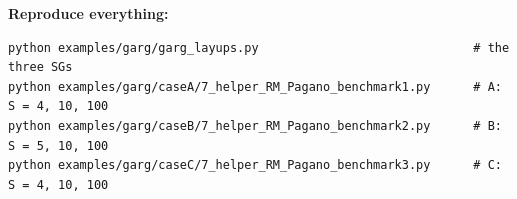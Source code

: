 \documentclass[11pt]{article}
\begin{document}
\textbf{Reproduce everything:}
\begin{verbatim}
python examples/garg/garg_layups.py                              # the three SGs
python examples/garg/caseA/7_helper_RM_Pagano_benchmark1.py      # A: S = 4, 10, 100
python examples/garg/caseB/7_helper_RM_Pagano_benchmark2.py      # B: S = 5, 10, 100
python examples/garg/caseC/7_helper_RM_Pagano_benchmark3.py      # C: S = 4, 10, 100
\end{verbatim}
\end{document}
